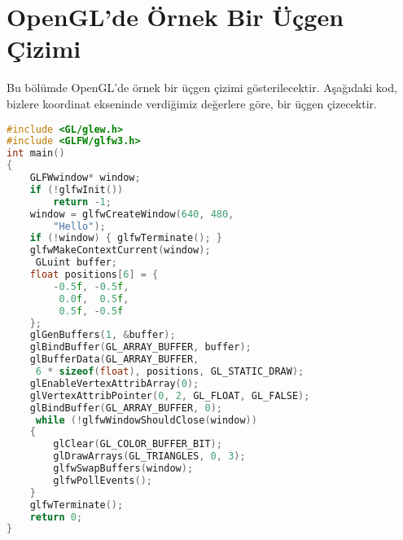 \documentclass{IEEEtran}
\begin{document}
\section{OpenGL'de Örnek Bir Üçgen Çizimi}
\label{sec:gosterim}
Bu bölümde OpenGL'de örnek bir üçgen çizimi gösterilecektir. Aşağıdaki kod, bizlere koordinat ekseninde verdiğimiz değerlere göre, bir üçgen çizecektir.
\begin{lstlisting}[language=C++]
#include <GL/glew.h>
#include <GLFW/glfw3.h>
int main()
{
    GLFWwindow* window;
    if (!glfwInit())
        return -1;
    window = glfwCreateWindow(640, 480, 
        "Hello");
    if (!window) { glfwTerminate(); }
    glfwMakeContextCurrent(window);
     GLuint buffer;
    float positions[6] = {
        -0.5f, -0.5f,
         0.0f,  0.5f,
         0.5f, -0.5f
    };
    glGenBuffers(1, &buffer);
    glBindBuffer(GL_ARRAY_BUFFER, buffer);
    glBufferData(GL_ARRAY_BUFFER,
     6 * sizeof(float), positions, GL_STATIC_DRAW);
    glEnableVertexAttribArray(0);
    glVertexAttribPointer(0, 2, GL_FLOAT, GL_FALSE);
    glBindBuffer(GL_ARRAY_BUFFER, 0);
     while (!glfwWindowShouldClose(window))
    {
        glClear(GL_COLOR_BUFFER_BIT);
        glDrawArrays(GL_TRIANGLES, 0, 3);
        glfwSwapBuffers(window);
        glfwPollEvents();
    }
    glfwTerminate();
    return 0;
}
\end{lstlisting}

\end{document}
